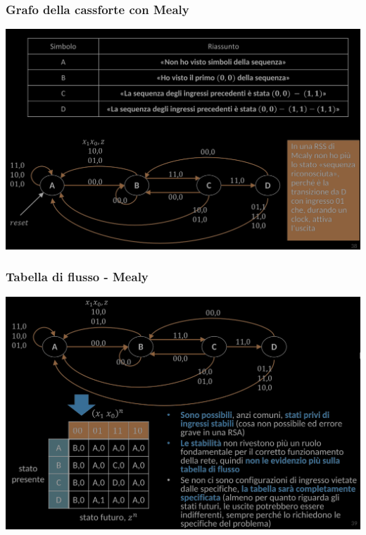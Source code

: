 \documentclass{article}
\begin{document}
\subsubsection*{Grafo della cassforte con Mealy}
\begin{center}
    \includegraphics[scale=0.4]{grafo-cassaforte-mealy.png}
\end{center}
\subsubsection*{Tabella di flusso - Mealy}
\begin{center}
    \includegraphics[scale=0.42]{TDF-cassaforte-rss-mealy.png}
\end{center}
\end{document}
